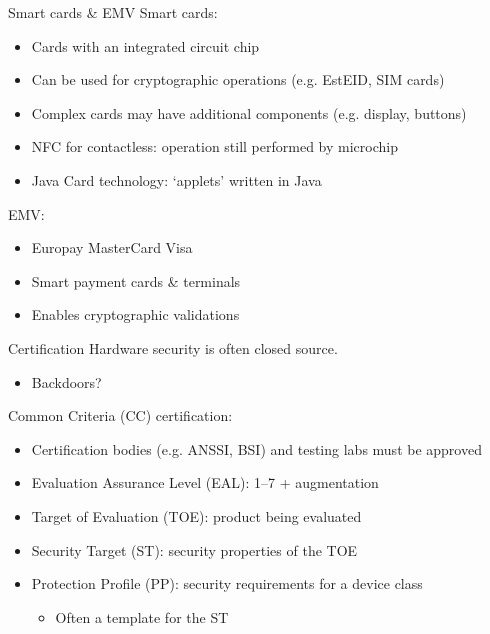 \begin{frame}{Smart cards \& EMV}
  Smart cards:
  \begin{itemize}[<+(1)->]
    \item Cards with an integrated circuit chip
    \item Can be used for cryptographic operations (e.g. EstEID, SIM cards)
    \item Complex cards may have additional components (e.g. display, buttons)
    \item NFC for contactless: operation still performed by microchip
    \item Java Card technology: `applets' written in Java
  \end{itemize}

  \vspace*{1em}

  \pause
  EMV:
  \begin{itemize}[<+(1)->]
    \item Europay MasterCard Visa
    \item Smart payment cards \& terminals
    \item Enables cryptographic validations
  \end{itemize}
\end{frame}

\begin{frame}{Certification}
  Hardware security is often closed source.
  \begin{itemize}[<+(1)->]
    \item Backdoors?
  \end{itemize}

  \vspace*{1em}

  \pause
  Common Criteria (CC) certification:
  \begin{itemize}[<+(1)->]
    \item Certification bodies (e.g. ANSSI, BSI) and testing labs must be approved
    \item Evaluation Assurance Level (EAL): 1--7 + augmentation
    \item Target of Evaluation (TOE): product being evaluated
    \item Security Target (ST): security properties of the TOE
    \item Protection Profile (PP): security requirements for a device class
    \begin{itemize}
      \item Often a template for the ST
    \end{itemize}
  \end{itemize}
\end{frame}

